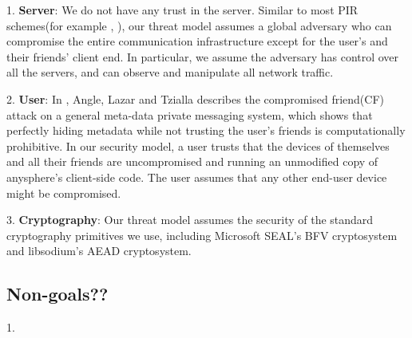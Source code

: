 


1. \textbf{Server}: We do not have any trust in the server. Similar to most PIR schemes(for example \cite{ahmad2021addra}, ), our threat model assumes a global adversary who can compromise the entire communication infrastructure except for the user's and their friends' client end. In particular, we assume the adversary has control over all the servers, and can observe and manipulate all network traffic.

2. \textbf{User}: In \cite{angel2018s}, Angle, Lazar and Tzialla describes the compromised friend(CF) attack on a general meta-data private messaging system, which shows that perfectly hiding metadata while not trusting the user's friends is computationally prohibitive. In our security model, a user trusts that the devices of themselves and all their friends are uncompromised and running an unmodified copy of anysphere's client-side code. The user assumes that any other end-user device might be compromised.

3. \textbf{Cryptography}: Our threat model assumes the security of the standard cryptography primitives we use, including Microsoft SEAL's BFV cryptosystem and libsodium's AEAD cryptosystem. 



\subsection{Non-goals??}
1. 


